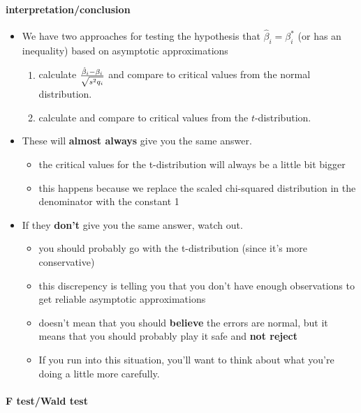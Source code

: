 \paragraph{interpretation/conclusion}
\begin{itemize}
\item We have two approaches for testing the hypothesis that
         $\hat\beta_i = \beta_i^*$ (or has an inequality) based on
         asymptotic approximations
\begin{enumerate}
\item calculate ${\hat\beta_i - \beta_i \over \sqrt{s^2 q_i}}$
            and compare to critical values from the normal distribution.
\item calculate and compare to critical values from the
            $t$-distribution.
\end{enumerate}
\item These will \textbf{almost always} give you the same answer.
\begin{itemize}
\item the critical values for the t-distribution will always be a
           little bit bigger
\item this happens because we replace the scaled chi-squared
           distribution in the denominator with the constant 1
\end{itemize}
\item If they \textbf{don't} give you the same answer, watch out.
\begin{itemize}
\item you should probably go with the t-distribution (since it's
           more conservative)
\item this discrepency is telling you that you don't have enough
           observations to get reliable asymptotic approximations
\item doesn't mean that you should \textbf{believe} the errors are
           normal, but it means that you should probably play it safe
           and \textbf{not reject}
\item If you run into this situation, you'll want to think about
           what you're doing a little more carefully.
\end{itemize}
\end{itemize}

\paragraph{F test/Wald test}

